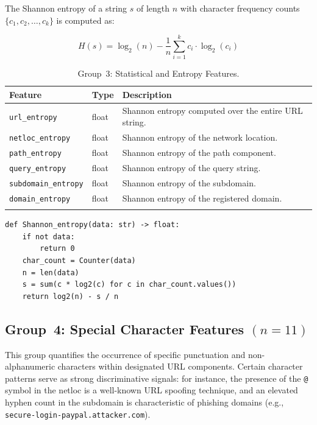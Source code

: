 \documentclass[a4paper,12pt]{article}
\begin{document}
The Shannon entropy of a string $s$ of length $n$ with character frequency counts $\{c_1, c_2, \ldots, c_k\}$ is computed as:

\begin{equation}
H(s) = \log_2(n) - \frac{1}{n}\sum_{i=1}^{k} c_i \cdot \log_2(c_i)
\label{eq:entropy}
\end{equation}

\begin{longtable}{p{4.5cm}p{1.5cm}p{7cm}}
\toprule
\textbf{Feature} & \textbf{Type} & \textbf{Description} \\
\midrule
\endhead
\texttt{url\_entropy}       & float & Shannon entropy computed over the entire URL string. \\
\texttt{netloc\_entropy}    & float & Shannon entropy of the network location. \\
\texttt{path\_entropy}      & float & Shannon entropy of the path component. \\
\texttt{query\_entropy}     & float & Shannon entropy of the query string. \\
\texttt{subdomain\_entropy} & float & Shannon entropy of the subdomain. \\
\texttt{domain\_entropy}    & float & Shannon entropy of the registered domain. \\
\bottomrule
\caption{Group~3: Statistical and Entropy Features.}
\label{tab:entropy}
\end{longtable}

\begin{lstlisting}[caption={Shannon entropy implementation}]
def Shannon_entropy(data: str) -> float:
    if not data:
        return 0
    char_count = Counter(data)
    n = len(data)
    s = sum(c * log2(c) for c in char_count.values())
    return log2(n) - s / n
\end{lstlisting}

\subsection{Group~4: Special Character Features \texorpdfstring{$(n=11)$}{(n=11)}}
\label{sec:feat_special}

This group quantifies the occurrence of specific punctuation and non-alphanumeric characters within designated URL components. Certain character patterns serve as strong discriminative signals: for instance, the presence of the \texttt{@} symbol in the netloc is a well-known URL spoofing technique, and an elevated hyphen count in the subdomain is characteristic of phishing domains (e.g., \texttt{secure-login-paypal.attacker.com}).
\end{document}
